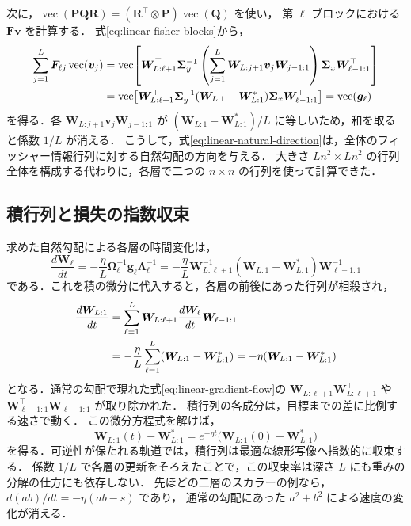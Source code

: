 \documentclass[../main.tex]{subfiles}
\begin{document}
次に，$\operatorname{vec}(\bm{P}\bm{Q}\bm{R})
=(\bm{R}^\top\otimes\bm{P})\operatorname{vec}(\bm{Q})$ を使い，
第 $\ell$ ブロックにおける $\bm{F}\bm{v}$ を計算する．
式\eqref{eq:linear-fisher-blocks}から，
\begin{align}
  \sum_{j=1}^L\bm{F}_{\ell j}\operatorname{vec}(\bm{v}_j)
  &=\operatorname{vec}\!\left[
  \bm{W}_{L:\ell+1}^\top\bm{\Sigma}_{y}^{-1}
  \left(\sum_{j=1}^L\bm{W}_{L:j+1}\bm{v}_j\bm{W}_{j-1:1}\right)
  \bm{\Sigma}_{x}\bm{W}_{\ell-1:1}^\top\right]
  \notag\\
  &=\operatorname{vec}\!\left[
  \bm{W}_{L:\ell+1}^\top\bm{\Sigma}_{y}^{-1}
  (\bm{W}_{L:1}-\bm{W}_{L:1}^*)
  \bm{\Sigma}_{x}\bm{W}_{\ell-1:1}^\top\right]
  =\operatorname{vec}(\bm{g}_\ell)
  \label{eq:linear-natural-verification}
\end{align}
を得る．各 $\bm{W}_{L:j+1}\bm{v}_j\bm{W}_{j-1:1}$ が
$(\bm{W}_{L:1}-\bm{W}_{L:1}^*)/L$ に等しいため，和を取ると係数 $1/L$ が消える．
こうして，式\eqref{eq:linear-natural-direction}は，全体のフィッシャー情報行列に対する自然勾配の方向を与える．
大きさ $Ln^2\times Ln^2$ の行列全体を構成する代わりに，各層で二つの $n\times n$ の行列を使って計算できた．

\subsection{積行列と損失の指数収束}

求めた自然勾配による各層の時間変化は，
\begin{equation}
  \frac{d\bm{W}_\ell}{dt}
  =-\frac{\eta}{L}\bm{\Omega}_\ell^{-1}
  \bm{g}_\ell\bm{\Lambda}_\ell^{-1}
  =-\frac{\eta}{L}\bm{W}_{L:\ell+1}^{-1}
  (\bm{W}_{L:1}-\bm{W}_{L:1}^*)
  \bm{W}_{\ell-1:1}^{-1}
  \label{eq:linear-natural-flow}
\end{equation}
である．これを積の微分に代入すると，各層の前後にあった行列が相殺され，
\begin{align}
  \frac{d\bm{W}_{L:1}}{dt}
  &=\sum_{\ell=1}^L\bm{W}_{L:\ell+1}
  \frac{d\bm{W}_\ell}{dt}\bm{W}_{\ell-1:1}\notag\\
  &=-\frac{\eta}{L}\sum_{\ell=1}^L
  (\bm{W}_{L:1}-\bm{W}_{L:1}^*)
  =-\eta(\bm{W}_{L:1}-\bm{W}_{L:1}^*)
  \label{eq:linear-total-natural-flow}
\end{align}
となる．通常の勾配で現れた式\eqref{eq:linear-gradient-flow}の
$\bm{W}_{L:\ell+1}\bm{W}_{L:\ell+1}^\top$ や $\bm{W}_{\ell-1:1}^\top\bm{W}_{\ell-1:1}$ が取り除かれた．
積行列の各成分は，目標までの差に比例する速さで動く．
この微分方程式を解けば，
\begin{equation}
  \bm{W}_{L:1}(t)-\bm{W}_{L:1}^*
  =e^{-\eta t}
  \bigl(\bm{W}_{L:1}(0)-\bm{W}_{L:1}^*\bigr)
  \label{eq:linear-total-solution}
\end{equation}
を得る．可逆性が保たれる軌道では，積行列は最適な線形写像へ指数的に収束する．
係数 $1/L$ で各層の更新をそろえたことで，この収束率は深さ $L$ にも重みの分解の仕方にも依存しない．
先ほどの二層のスカラーの例なら，$d(ab)/dt=-\eta(ab-s)$ であり，
通常の勾配にあった $a^2+b^2$ による速度の変化が消える．
\end{document}
